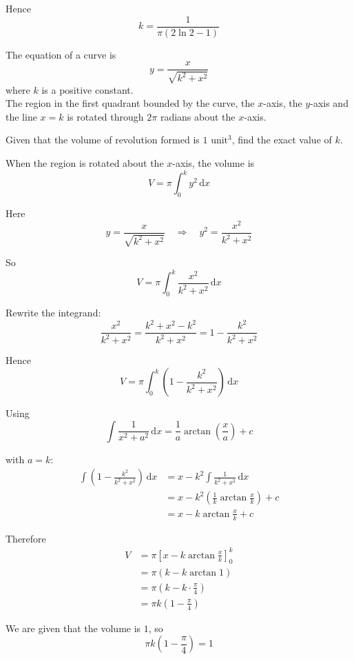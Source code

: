 \documentclass[leqno]{article}
\begin{document}
\begin{enumerate}[
  label=\textbf{\arabic*.},
  leftmargin=*,
  topsep=0pt,
  partopsep=0pt,
  parsep=0pt
]
\begin{djsSolution}
Hence
\[
k=\frac{1}{\pi(2\ln 2-1)}
\]
\end{djsSolution}


\newpage

\questionitem

The equation of a curve is \[y=\frac{x}{\sqrt{k^2+x^2}}\] where $k$ is a positive constant. \\

The region in the first quadrant bounded by the curve, the $x$-axis, the $y$-axis and the line $x=k$ is rotated through $2\pi$ radians about the $x$-axis.

Given that the volume of revolution formed is $1\text{ unit}^3$, find the exact value of $k$. 

\begin{djsSolution}
When the region is rotated about the $x$-axis, the volume is
\[
V=\pi\int_0^k y^2\,\mathrm{d}x
\]

Here
\[
y=\frac{x}{\sqrt{k^2+x^2}}
\quad\Longrightarrow\quad
y^2=\frac{x^2}{k^2+x^2}
\]

So
\[
V=\pi\int_0^k \frac{x^2}{k^2+x^2}\,\mathrm{d}x
\]

Rewrite the integrand:
\[
\frac{x^2}{k^2+x^2}
=\frac{k^2+x^2-k^2}{k^2+x^2}
=1-\frac{k^2}{k^2+x^2}
\]

Hence
\[
V=\pi\int_0^k \left(1-\frac{k^2}{k^2+x^2}\right)\,\mathrm{d}x
\]

Using
\[
\int \dfrac{1}{x^2+a^2}\,\mathrm{d}x=\dfrac{1}{a}\arctan\left(\dfrac{x}{a}\right)+c
\]

with $a=k$:
\begin{align*}
\int \left(1-\frac{k^2}{k^2+x^2}\right)\,\mathrm{d}x
&=x-k^2\int \frac{1}{k^2+x^2}\,\mathrm{d}x \\
&=x-k^2\left(\frac{1}{k}\arctan\frac{x}{k}\right)+c \\
&=x-k\arctan\frac{x}{k}+c
\end{align*}

Therefore
\begin{align*}
V
&=\pi\left[x-k\arctan\frac{x}{k}\right]_0^k \\
&=\pi\left(k-k\arctan 1\right) \\
&=\pi\left(k-k\cdot\frac{\pi}{4}\right) \\
&=\pi k\left(1-\frac{\pi}{4}\right)
\end{align*}

We are given that the volume is $1$, so
\[
\pi k\left(1-\frac{\pi}{4}\right)=1
\]


\end{djsSolution}
\end{enumerate}
\end{document}
